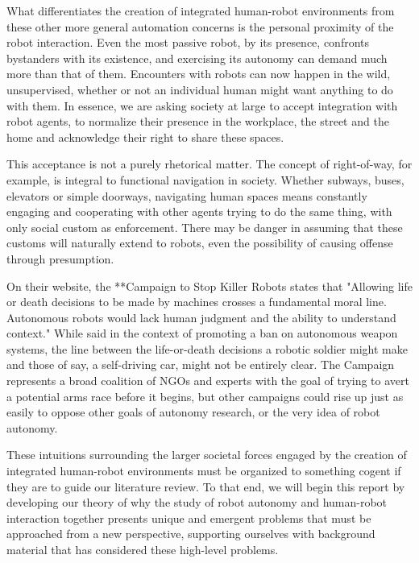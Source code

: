 \documentclass{sfuthesis}
\begin{document}
What differentiates the creation of integrated human-robot environments from these other more general automation concerns is the personal proximity of the robot interaction. Even the most passive robot, by its presence, confronts bystanders with its existence, and exercising its autonomy can demand much more than that of them. Encounters with robots can now happen in the wild, unsupervised, whether or not an individual human might want anything to do with them. In essence, we are asking society at large to accept integration with robot agents, to normalize their presence in the workplace, the street and the home and acknowledge their right to share these spaces.

This acceptance is not a purely rhetorical matter. The concept of right-of-way, for example, is integral to functional navigation in society. Whether subways, buses, elevators or simple doorways, navigating human spaces means constantly engaging and cooperating with other agents trying to do the same thing, with only social custom as enforcement. There may be danger in assuming that these customs will naturally extend to robots, even the possibility of causing offense through presumption.

On their website, the **Campaign to Stop Killer Robots states that "Allowing life or death decisions to be made by machines crosses a fundamental moral line. Autonomous robots would lack human judgment and the ability to understand context." While said in the context of promoting a ban on autonomous weapon systems, the line between the life-or-death decisions a robotic soldier might make and those of say, a self-driving car, might not be entirely clear. The Campaign represents a broad coalition of NGOs and experts with the goal of trying to avert a potential arms race before it begins, but other campaigns could rise up just as easily to oppose other goals of autonomy research, or the very idea of robot autonomy.


These intuitions surrounding the larger societal forces engaged by the creation of integrated human-robot environments must be organized to something cogent if they are to guide our literature review. To that end, we will begin this report by developing our theory of why the study of robot autonomy and human-robot interaction together presents unique and emergent problems that must be approached from a new perspective, supporting ourselves with background material that has considered these high-level problems.
\end{document}
